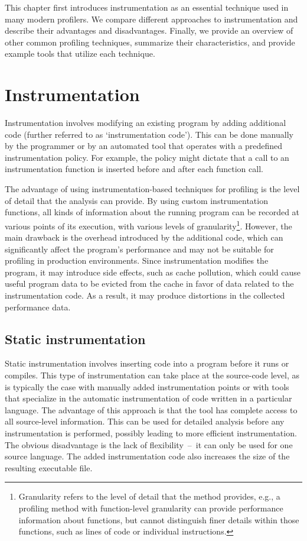This chapter first introduces instrumentation as an essential technique used in many modern profilers. We compare different approaches to instrumentation and describe their advantages and disadvantages. Finally, we provide an overview of other common profiling techniques, summarize their characteristics, and provide example tools that utilize each technique. 


\section{Instrumentation}

Instrumentation involves modifying an existing program by adding additional code (further referred to as `instrumentation code'). This can be done manually by the programmer or by an automated tool that operates with a predefined instrumentation policy. For example, the policy might dictate that a call to an instrumentation function is inserted before and after each function call.

The advantage of using instrumentation-based techniques for profiling is the level of detail that the analysis can provide. By using custom instrumentation functions, all kinds of information about the running program can be recorded at various points of its execution, with various levels of granularity\footnote{Granularity refers to the level of detail that the method provides, e.g., a profiling method with function-level granularity can provide performance information about functions, but cannot distinguish finer details within those functions, such as lines of code or individual instructions.}. However, the main drawback is the overhead introduced by the additional code, which can significantly affect the program's performance and may not be suitable for profiling in production environments. Since instrumentation modifies the program, it may introduce side effects, such as cache pollution, which could cause useful program data to be evicted from the cache in favor of data related to the instrumentation code. As a result, it may produce distortions in the collected performance data.

\subsection{Static instrumentation}
Static instrumentation involves inserting code into a program before it runs or compiles. This type of instrumentation can take place at the source-code level, as is typically the case with manually added instrumentation points or with tools that specialize in the automatic instrumentation of code written in a particular language. The advantage of this approach is that the tool has complete access to all source-level information. This can be used for detailed analysis before any instrumentation is performed, possibly leading to more efficient instrumentation. The obvious disadvantage is the lack of flexibility \,--\, it can only be used for one source language. The added instrumentation code also increases the size of the resulting executable file.

